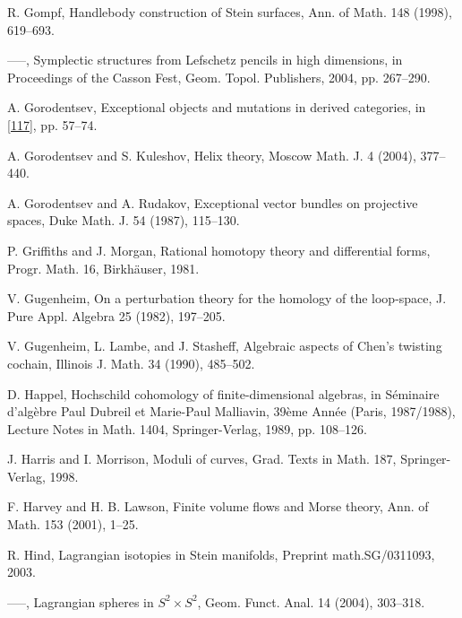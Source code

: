 \begin{list}{}{\setlength{\leftmargin}{3em}\setlength{\labelwidth}{2.5em}\setlength{\itemsep}{.5em}\small}
\item[\hypertarget{bib:63}{[63]}] R. Gompf, Handlebody construction of Stein surfaces, Ann. of Math. 148 (1998), 619–693. 
\item[\hypertarget{bib:64}{[64]}] —–, Symplectic structures from Lefschetz pencils in high dimensions, in Proceedings of the Casson Fest, Geom. Topol. Publishers, 2004, pp. 267–290. 
\item[\hypertarget{bib:65}{[65]}] A. Gorodentsev, Exceptional objects and mutations in derived categories, in \hyperlink{bib:117}{[117]}, pp. 57–74. 
\item[\hypertarget{bib:66}{[66]}] A. Gorodentsev and S. Kuleshov, Helix theory, Moscow Math. J. 4 (2004), 377–440. 
\item[\hypertarget{bib:67}{[67]}] A. Gorodentsev and A. Rudakov, Exceptional vector bundles on projective spaces, Duke Math. J. 54 (1987), 115–130. 
\item[\hypertarget{bib:68}{[68]}] P. Griffiths and J. Morgan, Rational homotopy theory and differential forms, Progr. Math. 16, Birkhäuser, 1981. 
\item[\hypertarget{bib:69}{[69]}] V. Gugenheim, On a perturbation theory for the homology of the loop-space, J. Pure Appl. Algebra 25 (1982), 197–205. 
\item[\hypertarget{bib:70}{[70]}] V. Gugenheim, L. Lambe, and J. Stasheff, Algebraic aspects of Chen's twisting cochain, Illinois J. Math. 34 (1990), 485–502. 
\item[\hypertarget{bib:71}{[71]}] D. Happel, Hochschild cohomology of finite-dimensional algebras, in Séminaire d'algèbre Paul Dubreil et Marie-Paul Malliavin, 39ème Année (Paris, 1987/1988), Lecture Notes in Math. 1404, Springer-Verlag, 1989, pp. 108–126. 
\item[\hypertarget{bib:72}{[72]}] J. Harris and I. Morrison, Moduli of curves, Grad. Texts in Math. 187, Springer-Verlag, 1998. 
\item[\hypertarget{bib:73}{[73]}] F. Harvey and H. B. Lawson, Finite volume flows and Morse theory, Ann. of Math. 153 (2001), 1–25. 
\item[\hypertarget{bib:74}{[74]}] R. Hind, Lagrangian isotopies in Stein manifolds, Preprint math.SG/0311093, 2003. 
\item[\hypertarget{bib:75}{[75]}] —–, Lagrangian spheres in $S^2\times S^2$, Geom. Funct. Anal. 14 (2004), 303–318. 

\end{list}
